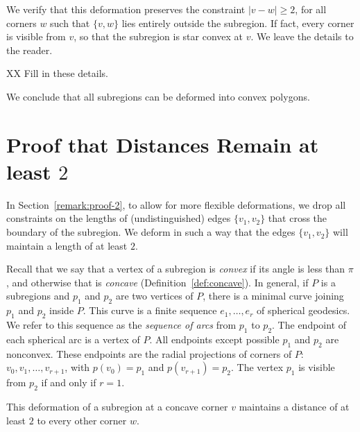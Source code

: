 We verify that this deformation preserves the constraint
$|v-w|\ge2$, for all corners $w$ such that $\{v,w\}$ lies entirely
outside the subregion.  If fact,  every corner is visible from
$v$, so that the subregion is star convex at $v$. We leave the
details to the reader.

XX Fill in these details.

We conclude that all subregions can be deformed into convex polygons.





\section{Proof that Distances Remain at least $2$} %
    \label{sec:proof-2}


\begin{remark}
\label{flexremark} In Section~\ref{remark:proof-2}, to allow for
more flexible deformations, we drop all constraints on the lengths
of (undistinguished) edges $\{v_1,v_2\}$ that cross the boundary of
the subregion.  We deform in such a way that the edges $\{v_1,v_2\}$
will maintain a length of at least $2$.
\end{remark}


Recall that we say that a vertex of a subregion is {\it convex\/}
if its angle is less than $\pi$, and otherwise that is {\it
concave}
(Definition~\ref{def:concave}).
%
In general, if $P$ is a subregions and $p_1$ and $p_2$ are two
vertices of $P$, there is a minimal curve joining $p_1$ and $p_2$
inside $P$.  This curve is a finite sequence $e_1,\ldots, e_r$ of
spherical geodesics.  We refer to this sequence as the {\it sequence
of arcs\/}  from $p_1$ to $p_2$. The endpoint of
each spherical arc is a vertex of $P$. All endpoints except possible
$p_1$ and $p_2$ are nonconvex. These endpoints are the radial
projections of corners of $P$: $v_0,v_1,\ldots,v_{r+1}$, with
$p(v_0)=p_1$ and $p(v_{r+1})=p_2$. The vertex $p_1$ is visible from
$p_2$ if and only if $r=1$.


\begin{lemma}\label{dist2}
This deformation of a subregion at a concave corner $v$ maintains
a distance of at least $2$ to every other corner $w$.
\end{lemma}

